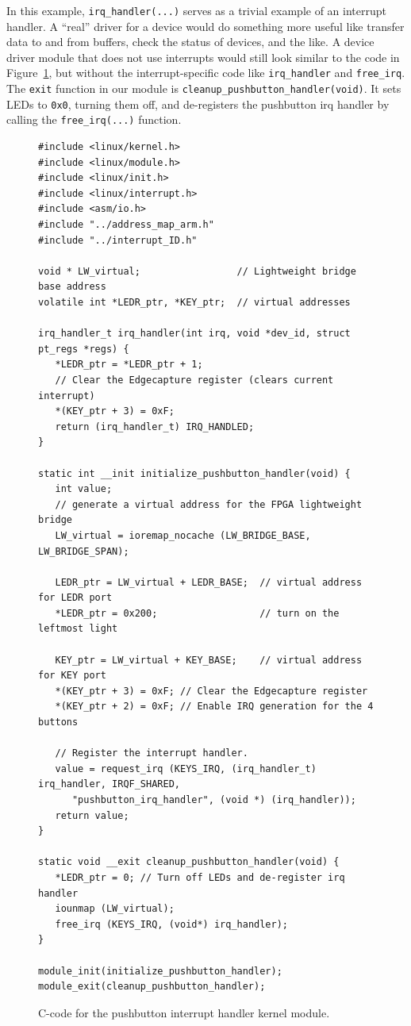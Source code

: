 \documentclass[11pt, twoside, pdftex]{article}
\begin{document}
In this example, \texttt{irq\_handler(...)} serves as a trivial example of an interrupt handler.
A ``real'' driver for a device would do something more useful like transfer data to and from 
buffers, check the status of devices, and the like. A device driver module that does not use
interrupts would still look similar to the code in Figure~\ref{fig:pushbutton_irq_handler_code}, 
but without the interrupt-specific code like \texttt{irq\_handler} and \texttt{free\_irq}.
The \texttt{exit} function in our module is \texttt{cleanup\_pushbutton\_handler(void)}. It sets 
LEDs to \texttt{0x0}, turning them off, and de-registers the pushbutton irq handler by calling 
the \texttt{free\_irq(...)} function. 

\lstset{language=C,numbers=left}
\begin{figure}[H]
\begin{center}
\begin{minipage}[t]{16 cm}
\begin{lstlisting}
#include <linux/kernel.h>
#include <linux/module.h>
#include <linux/init.h>
#include <linux/interrupt.h>
#include <asm/io.h>
#include "../address_map_arm.h"
#include "../interrupt_ID.h"

void * LW_virtual;                 // Lightweight bridge base address
volatile int *LEDR_ptr, *KEY_ptr;  // virtual addresses

irq_handler_t irq_handler(int irq, void *dev_id, struct pt_regs *regs) {
   *LEDR_ptr = *LEDR_ptr + 1;
   // Clear the Edgecapture register (clears current interrupt)
   *(KEY_ptr + 3) = 0xF; 
   return (irq_handler_t) IRQ_HANDLED;
}

static int __init initialize_pushbutton_handler(void) {
   int value;
   // generate a virtual address for the FPGA lightweight bridge
   LW_virtual = ioremap_nocache (LW_BRIDGE_BASE, LW_BRIDGE_SPAN);

   LEDR_ptr = LW_virtual + LEDR_BASE;  // virtual address for LEDR port
   *LEDR_ptr = 0x200;                  // turn on the leftmost light

   KEY_ptr = LW_virtual + KEY_BASE;    // virtual address for KEY port
   *(KEY_ptr + 3) = 0xF; // Clear the Edgecapture register
   *(KEY_ptr + 2) = 0xF; // Enable IRQ generation for the 4 buttons

   // Register the interrupt handler.
   value = request_irq (KEYS_IRQ, (irq_handler_t) irq_handler, IRQF_SHARED, 
      "pushbutton_irq_handler", (void *) (irq_handler));
   return value;
}

static void __exit cleanup_pushbutton_handler(void) {
   *LEDR_ptr = 0; // Turn off LEDs and de-register irq handler
   iounmap (LW_virtual);
   free_irq (KEYS_IRQ, (void*) irq_handler);
}

module_init(initialize_pushbutton_handler);
module_exit(cleanup_pushbutton_handler);
\end{lstlisting}
\end{minipage}
\end{center}
\caption{C-code for the pushbutton interrupt handler kernel module.}
\label{fig:pushbutton_irq_handler_code}
\end{figure}
\end{document}
